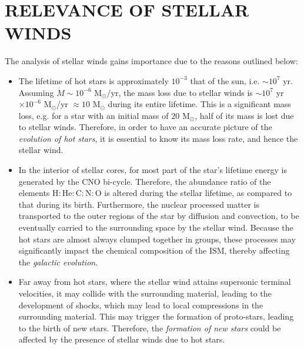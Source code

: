 	\section{\MakeUppercase{Relevance of Stellar Winds}} \label{tool:relevance}
		The analysis of stellar winds gains importance due to the reasons outlined below:
		\begin{itemize}
			\item The lifetime of hot stars is approximately $10^{-3}$ that of the sun, i.e. $\sim 10^7$ yr. Assuming $\dot{M}\sim 10^{-6}$ M$_\odot$/yr, the mass loss due to stellar winds is $\sim 10^7$ yr $\times 10^{-6}$ M$_\odot$/yr $\approx 10$ M$_\odot$ during its entire lifetime. This is a significant mass loss, e.g. for a star with an initial mass of $20$ M$_\odot$, half of its mass is lost due to stellar winds. Therefore, in order to have an accurate picture of the \emph{evolution of hot stars}, it is essential to know its mass loss rate, and hence the stellar wind.
			\item In the interior of stellar cores, for most part of the star's lifetime energy is generated by the CNO bi-cycle. Therefore, the abundance ratio of the elements $\text{H}:\text{He}:\text{C}:\text{N}:\text{O}$ is altered during the stellar lifetime, as compared to that during its birth. Furthermore, the nuclear processed matter is transported to the outer regions of the star by diffusion and convection, to be eventually carried to the surrounding space by the stellar wind. Because the hot stars are almost always clumped together in groups, these processes may significantly impact the chemical composition of the ISM, thereby affecting the \emph{galactic evolution}.
			\item Far away from hot stars, where the stellar wind attains supersonic terminal velocities, it may collide with the surrounding material, leading to the development of shocks, which may lead to local compressions in the surrounding material. This may trigger the formation of proto-stars, leading to the birth of new stars. Therefore, the \emph{formation of new stars} could be affected by the presence of stellar winds due to hot stars.
		\end{itemize}
	
